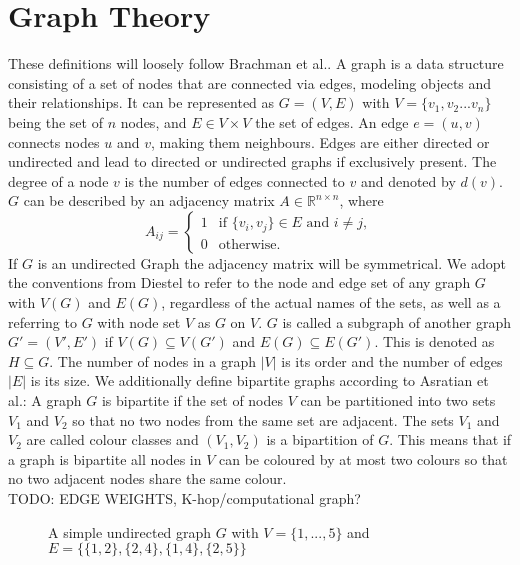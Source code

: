 \section{Graph Theory}
These definitions will loosely follow Brachman et al.\cite{}. A graph is a data structure consisting of a set of nodes that are connected via edges, modeling objects and their relationships. It can be represented as $G=(V,E)$ with $V=\{v_1,v_2...v_n\}$ being the set of $n$ nodes, and $E \in V \times V$ the set of edges. An edge $e=(u,v)$ connects nodes $u$ and $v$, making them neighbours. Edges are either directed or undirected and lead to directed or undirected graphs if exclusively present. The degree of a node $v$ is the number of edges connected to $v$ and denoted by $d(v)$. $G$ can be described by an adjacency matrix $A \in \mathbb{R}^{n \times n}$, where
$$A_{ij}=\begin{cases}
    1 & \text{if } \{v_i,v_j\}\in E \text{ and } i \neq j, \\
    0 & \text{otherwise.}
\end{cases}$$
If $G$ is an undirected Graph the adjacency matrix will be symmetrical. We adopt the conventions from Diestel\cite{Diestel2017} to refer to the node and edge set of any graph $G$ with $V(G)$ and $E(G)$, regardless of the actual names of the sets, as well as a referring to $G$ with node set $V$ as $G$ on $V$. $G$ is called a subgraph of another graph $G'=(V',E')$ if $V(G) \subseteq V(G')$ and $E(G) \subseteq E(G')$. This is denoted as $H \subseteq G$. The number of nodes in a graph $|V|$ is its order and the number of edges $|E|$ is its size.
We additionally define bipartite graphs according to Asratian et al.\cite{asratian1998}: A graph $G$ is bipartite if the set of nodes $V$ can be partitioned into two sets $V_1$ and $V_2$ so that no two nodes from the same set are adjacent. The sets $V_1$ and $V_2$ are called colour classes and $(V_1, V_2)$ is a bipartition of $G$. This means that if a graph is bipartite all nodes in $V$ can be coloured by at most two colours so that no two adjacent nodes share the same colour.\\
TODO: EDGE WEIGHTS, K-hop/computational graph?
\begin{figure}[h]
    \centering
    \caption{A simple undirected graph $G$ with $V=\{1,...,5\}$ and $E=\{\{1,2\},\{2,4\},\{1,4\},\{2,5\}\}$}
    \label{fig:graph-example}
\end{figure}

